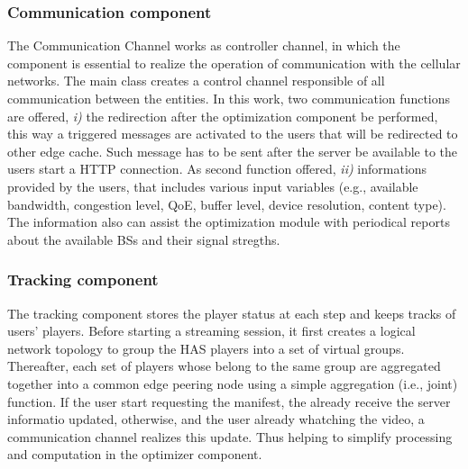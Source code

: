\subsubsection*{Communication component}

The Communication Channel works as controller channel, in which the component is essential to realize the operation of communication with the cellular networks. The main class creates a control channel responsible of all communication between the entities. In this work, two communication functions are offered, \textit{i)} the redirection after the optimization component be performed, this way a triggered messages are activated to the users that will be redirected to other edge cache. Such message has to be sent after the server be available to the users start a HTTP connection. As second function offered, \textit{ii)} informations provided by the users, that includes various input variables (e.g., available bandwidth, congestion level, QoE, buffer level, device resolution, content type).
The information also can assist the optimization module with periodical reports about the available BSs and their signal stregths. 

\subsubsection*{Tracking component}

The tracking component stores the player status at each step and keeps tracks of users' players. Before starting a streaming session, it first creates a logical network topology to group the HAS players into a set of virtual groups. Thereafter, each set of players whose belong to the same group are aggregated together into a common edge peering node using a simple aggregation (i.e., joint) function. If the user start requesting  the manifest, the already receive the server informatio updated, otherwise, and the user already whatching the video, a communication channel realizes this update. Thus helping to simplify processing and computation in the optimizer component.

